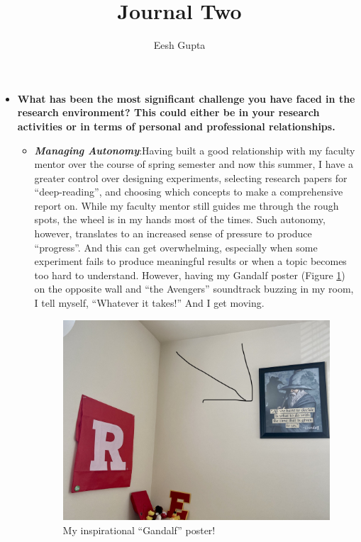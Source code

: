 \documentclass{article}
\title{Journal Two }
\author{Eesh Gupta}
\newcommand{\s}{\item[]}
\begin{document}
\maketitle






\begin{itemize}
\item \textbf{What has been the most significant challenge you have faced in the research environment? This could either be in your
research activities or in terms of personal and professional relationships.}
\begin{itemize}
  \s \textit{\textbf{Managing Autonomy}}:Having built a good relationship with my faculty mentor over
  the course of spring semester and now this summer, I have a greater
  control over
  designing experiments, selecting research papers for ``deep-reading'', and
  choosing which concepts to make a comprehensive report on. While
  my faculty mentor still guides me through the rough spots, the wheel
  is in my hands most of the times. Such autonomy, however, translates to an increased sense of
  pressure to produce ``progress''. And this can get overwhelming, especially when some experiment fails to produce meaningful results or when a topic
  becomes too hard to understand. However,
  having my Gandalf poster (Figure \ref{fig1}) on the opposite wall and ``the Avengers'' soundtrack buzzing
  in my room, I tell myself, ``Whatever it takes!'' And I get moving.
  \begin{figure}[!htb]
	\centering
	\includegraphics[width=1\textwidth]{img/JournalTwo-c8f6d4a9.png}
	\caption{My inspirational ``Gandalf'' poster!}
	\label{fig1}
\end{figure}


\end{itemize}
\end{itemize}
\end{document}
